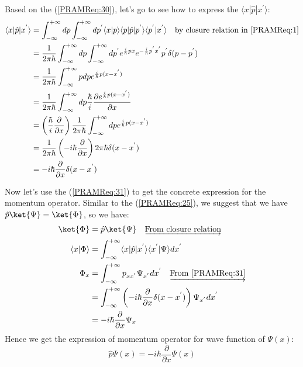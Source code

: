 Based on the (\ref{PRAMReq:30}), let's go to see how to express the
$\langle x|\hat{p}|x^{'}\rangle$:
\begin{equation}
  \label{PRAMReq:31}
  \begin{split}
    \langle x|\hat{p}|x^{'}\rangle &= \int^{+\infty}_{-\infty}dp
    \int^{+\infty}_{-\infty}dp^{'} \langle x|p\rangle \langle
    p|\hat{p}|p^{'}\rangle \langle p^{'}|x^{'}\rangle \quad
    \text{by closure relation in \ref{PRAMReq:1}}  \\
    &= \frac{1}{2\pi\hbar}\int^{+\infty}_{-\infty}dp
    \int^{+\infty}_{-\infty}dp^{'}
    e^{\frac{i}{\hbar}px}e^{-\frac{i}{\hbar}p^{'}x^{'}}
    p^{'}\delta(p-p^{'}) \\
    &= \frac{1}{2\pi\hbar}\int^{+\infty}_{-\infty}pdp
    e^{\frac{i}{\hbar}p(x-x^{'})}  \\
    &= \frac{1}{2\pi\hbar}\int^{+\infty}_{-\infty}dp
    \frac{\hbar}{i}\frac{\partial e^{\frac{i}{\hbar}p(x-x^{'})} }
    {\partial x} \\
    &= \left(\frac{\hbar}{i}\frac{\partial}{\partial x}\right)
    \frac{1}{2\pi\hbar}\int^{+\infty}_{-\infty}dp
    e^{\frac{i}{\hbar}p(x-x^{'})}  \\
    &=\frac{1}{2\pi\hbar}\left(-i\hbar \frac{\partial}{\partial
        x}\right)
    2\pi\hbar \delta(x - x^{'}) \\
    &=-i\hbar \frac{\partial}{\partial x}\delta(x - x^{'})
  \end{split}
\end{equation}

Now let's use the (\ref{PRAMReq:31}) to get the concrete expression
for the momentum operator. Similar to the (\ref{PRAMReq:25}), we
suggest that we have $\hat{p}\ket{\Psi} = \ket{\Phi}$, so we have:
\begin{equation}\label{PRAMReq:32}
\begin{split}
  \ket{\Phi} &= \hat{p}\ket{\Psi} \quad
  \underrightarrow{\text{From closure relation}} \\
  \langle x|\Phi \rangle &= \int^{+\infty}_{-\infty} \langle
  x|\hat{p}|x^{'} \rangle \langle x^{'}|\Psi
  \rangle dx^{'}\\
  \Phi_{x} &= \int^{+\infty}_{-\infty} p_{xx^{'}}\Psi_{x^{'}}dx^{'}
  \quad
  \underrightarrow{\text{From \ref{PRAMReq:31}}} \\
  &= \int^{+\infty}_{-\infty} \left(-i\hbar \frac{\partial}{\partial
      x}\delta(x - x^{'})\right) \Psi_{x^{'}}dx^{'} \\
  &=  -i\hbar \frac{\partial}{\partial x}\Psi_{x}
\end{split}
\end{equation}
Hence we get the expression of momentum operator for wave function
of $\Psi(x)$:
\begin{equation}\label{PRAMReq:33}
\hat{p}\Psi(x) = -i\hbar \frac{\partial}{\partial x}\Psi(x)
\end{equation}


